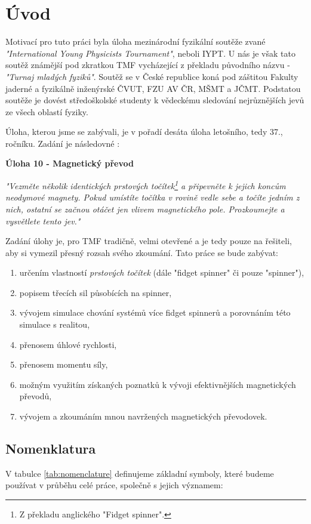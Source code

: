
\chapter{Úvod}
\label{chap:introduction}
Motivací pro tuto práci byla úloha mezinárodní fyzikální soutěže zvané \textit{"International Young Physicists Tournament"}, neboli IYPT.
U nás je však tato soutěž známější pod zkratkou TMF vycházející z překladu původního názvu - \textit{"Turnaj mladých fyziků"}.
Soutěž se v České republice koná pod záštitou Fakulty jaderné a fyzikálně inženýrské ČVUT, FZU AV ČR, MŠMT a JČMT. Podstatou soutěže je dovést středoškolské studenty k vědeckému sledování nejrůznějších jevů ze všech oblastí fyziky.

Úloha, kterou jsme se zabývali, je v pořadí desáta úloha letošního, tedy 37., ročníku. Zadání je následovné \cite{tmf_tasks}:

\textbf{Úloha 10 - Magnetický převod}

\textit{"Vezměte několik identických prstových točítek\footnote{Z překladu anglického "Fidget spinner".} a připevněte k jejich koncům neodymové magnety. Pokud umístíte točítka v rovině vedle sebe a točíte jedním z nich, ostatní se začnou otáčet jen vlivem magnetického pole. Prozkoumejte a vysvětlete tento jev."}

Zadání úlohy je, pro TMF tradičně, velmi otevřené a je tedy pouze na řešiteli, aby si vymezil přesný rozsah svého zkoumání.
Tato práce se bude zabývat:

\begin{enumerate}[topsep=0pt, partopsep=0pt]
    \setlength{\itemsep}{0pt}%
    \setlength{\parskip}{0pt}%
    \item určením vlastností \textit{prstových točítek} (dále "fidget spinner" či pouze "spinner"),
    \item popisem třecích sil působících na spinner,
    \item vývojem simulace chování systémů více fidget spinnerů a porovnáním této simulace s realitou,
    \item přenosem úhlové rychlosti,
    \item přenosem momentu síly,
    \item možným využitím získaných poznatků k vývoji efektivnějších magnetických převodů,
    \item vývojem a zkoumáním mnou navržených magnetických převodovek.
\end{enumerate}

\clearpage

\section[Nomenklatura]{Nomenklatura}
\label{sec:nomenclature}
V tabulce \ref{tab:nomenclature} definujeme základní symboly, které budeme používat v průběhu celé práce, společně s jejich významem:

